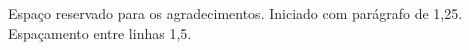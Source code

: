 
\begin{agradecimentos}
\vspace{-\baselineskip} %
Espaço reservado para os agradecimentos. Iniciado com parágrafo de 1,25. Espaçamento entre linhas 1,5.
\end{agradecimentos}
